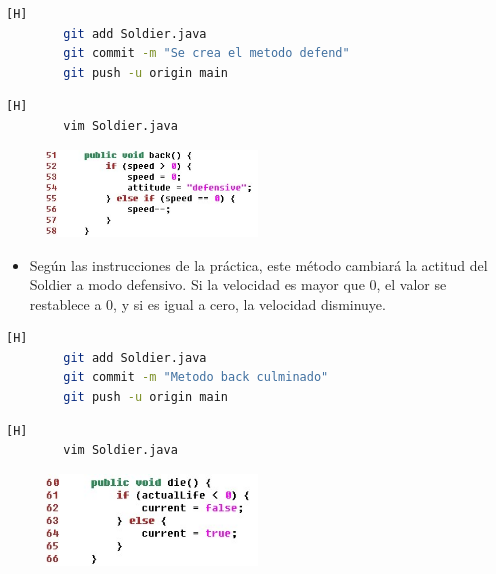 \documentclass{article}
\begin{document}
	\begin{lstlisting}[language=bash,caption={Commit: 6b573ae3b1c0241a758325f55f311e19e76361f3 }][H]
		git add Soldier.java
		git commit -m "Se crea el metodo defend"			
		git push -u origin main
	\end{lstlisting}
	
	
		
	\begin{lstlisting}[language=bash,caption={Se crea el metodo retroceder}][H]
		vim Soldier.java
	\end{lstlisting}
	
	\begin{figure}[H]
		\centering
		\includegraphics[width=0.5\textwidth,keepaspectratio]{img/back.jpg}
	\end{figure}
	
	\begin{itemize}	
		\item Según las instrucciones de la práctica, este método cambiará la actitud del Soldier a modo defensivo. Si la velocidad es mayor que 0, el valor se restablece a 0, y si es igual a cero, la velocidad disminuye.
	\end{itemize}
	
	\begin{lstlisting}[language=bash,caption={Commit: f1de159aef9b2d9484f6fcfc3a72032764cc36ab }][H]
		git add Soldier.java
		git commit -m "Metodo back culminado"			
		git push -u origin main
	\end{lstlisting}	
	
			
	\begin{lstlisting}[language=bash,caption={Se crea el metodo morir}][H]
		vim Soldier.java
	\end{lstlisting}
	
	\begin{figure}[H]
		\centering
		\includegraphics[width=0.5\textwidth,keepaspectratio]{img/die.jpg}
	\end{figure}
	
\end{document}
